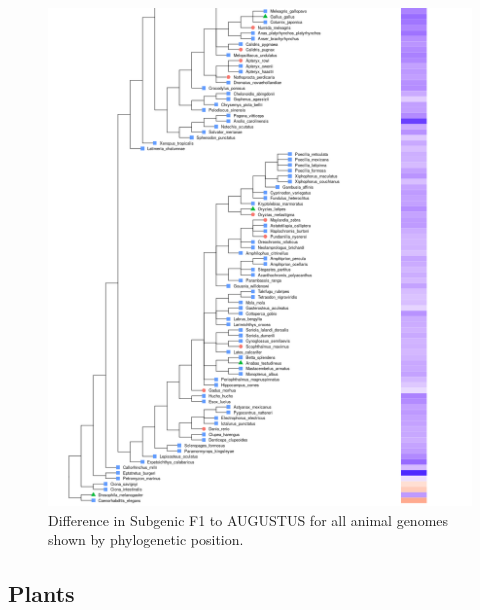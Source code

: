 \documentclass{article}
\begin{document}
\begin{figure}[!h]
\renewcommand\thefigure{S2}
\centerline{\includegraphics[width=1.2\textwidth]{images/animals_differences_part2}}
\caption{Difference in Subgenic F1 to AUGUSTUS for all animal genomes shown by phylogenetic position.}
\end{figure}

\clearpage
\subsection{Plants}
\end{document}
